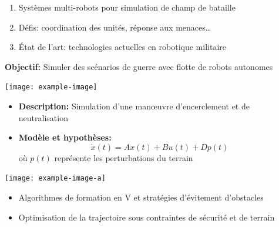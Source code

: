 \documentclass[a0,landscape]{a0poster}
\begin{document}
\begin{center}
\begin{minipage}[t]{0.49\linewidth}
    \begin{militarybox}
    \begin{enumerate}[label=\textbf{\arabic*.}, leftmargin=1cm]
        \item Systèmes multi-robots pour simulation de champ de bataille
        \item Défis: coordination des unités, réponse aux menaces\ldots
        \item État de l'art: technologies actuelles en robotique militaire
    \end{enumerate}

    \vspace{0.5ex}
    \textbf{Objectif:} Simuler des scénarios de guerre avec flotte de robots autonomes

    \vspace{0.5ex}
    \begin{center}
    \texttt{[image: example-image]} %
    \end{center}
    \end{militarybox}
\end{minipage}
\hfill
\begin{minipage}[t]{0.49\linewidth}
    \begin{militarybox}
    \begin{itemize}
        \item \textbf{Description:} Simulation d'une manœuvre d'encerclement et de neutralisation
        \item \textbf{Modèle et hypothèses:} 
        \[
            \dot{x}(t) = A x(t) + B u(t) + D p(t)
        \]
        où $p(t)$ représente les perturbations du terrain
    \end{itemize}
    
    \vspace{0.5ex}
    \begin{center}
    \texttt{[image: example-image-a]} %
    \end{center}
    \end{militarybox}
\end{minipage}

\vspace{0.5cm}

\begin{minipage}[t]{0.49\linewidth}
    \begin{militarybox}
    \begin{itemize}
        \item Algorithmes de formation en V et stratégies d'évitement d'obstacles
        \item Optimisation de la trajectoire sous contraintes de sécurité et de terrain
    \end{itemize}
    

\end{militarybox}
\end{minipage}
\end{center}
\end{document}
